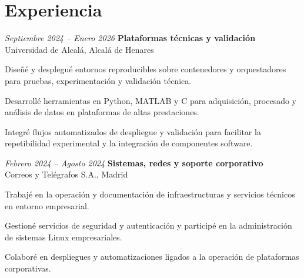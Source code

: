 \vspace{-7pt}

\section{Experiencia}

\begin{twocolentry}{\textit{Septiembre 2024 – Enero 2026}}
	\textbf{Plataformas técnicas y validación} \\
	Universidad de Alcalá, Alcalá de Henares
\end{twocolentry}
\begin{onecolentry}
	\begin{highlights}
		\item Diseñé y desplegué entornos reproducibles sobre contenedores y orquestadores para pruebas, experimentación y validación técnica.
		\item Desarrollé herramientas en Python, MATLAB y C para adquisición, procesado y análisis de datos en plataformas de altas prestaciones.
		\item Integré flujos automatizados de despliegue y validación para facilitar la repetibilidad experimental y la integración de componentes software.
	\end{highlights}
\end{onecolentry}

\vspace{0.2 cm}

\begin{twocolentry}{\textit{Febrero 2024 – Agosto 2024}}
	\textbf{Sistemas, redes y soporte corporativo} \\
	Correos y Telégrafos S.A., Madrid
\end{twocolentry}
\begin{onecolentry}
	\begin{highlights}
		\item Trabajé en la operación y documentación de infraestructuras y servicios técnicos en entorno empresarial.
		\item Gestioné servicios de seguridad y autenticación y participé en la administración de sistemas Linux empresariales.
		\item Colaboré en despliegues y automatizaciones ligados a la operación de plataformas corporativas.
	\end{highlights}
\end{onecolentry}

\vspace{0.2 cm}

